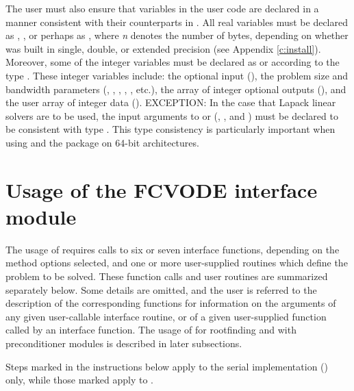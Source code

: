 The user must also ensure that variables in the user {\F} code are
declared in a manner consistent with their counterparts in {\cvode}.
All real variables must be declared as , ,
or perhaps as , where {\em n} denotes the number of bytes,
depending on whether {\cvode} was built in single, double, or extended precision 
(see Appendix \ref{c:install}). Moreover, some of the {\F} integer variables
must be declared as  or  according to the 
{\C} type .  These integer variables include:
the optional input (), the problem size and bandwidth parameters
(, , , , , etc.),
the array of integer optional outputs (),
and the user array of integer data ().
EXCEPTION: In the case that Lapack linear solvers are to be used, the
input arguments to  or  (,
, and ) must be declared to be consistent with {\C} type .
This type consistency is particularly important when using {\cvode} and the
{\fcvode} package on 64-bit architectures.


\section{Usage of the FCVODE interface module}\label{ss:fcvode_usage}

The usage of {\fcvode} requires calls to six or seven interface
functions, depending on the method options selected, and one or more
user-supplied routines which define the problem to be solved.  These
function calls and user routines are summarized separately below.
Some details are omitted, and the user is referred to the description
of the corresponding {\cvode} functions for information on the arguments 
of any given user-callable interface routine, or of a given user-supplied 
function called by an interface function.
The usage of {\fcvode} for rootfinding and with preconditioner modules is
described in later subsections.

Steps marked {\s} in the instructions below apply to the serial
{\nvector} implementation ({\nvecs}) only, while those marked {\p}
apply to {\nvecp}.

